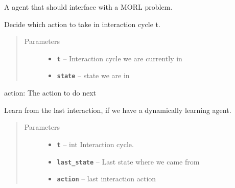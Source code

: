 \documentclass[letterpaper,10pt,english]{sphinxmanual}
\begin{document}

\begin{fulllineitems}
\label{Agents:morl_agents.MorlAgent}
A agent that should interface with a MORL problem.

\begin{fulllineitems}
\label{Agents:morl_agents.MorlAgent.decide}
Decide which action to take in interaction
cycle t.
\begin{quote}\begin{description}
\item[{Parameters}] \leavevmode\begin{itemize}
\item {} 
\textbf{\texttt{t}} -- Interaction cycle we are currently in

\item {} 
\textbf{\texttt{state}} -- state we are in

\end{itemize}

\end{description}\end{quote}

action: The action to do next

\end{fulllineitems}


\begin{fulllineitems}
\label{Agents:morl_agents.MorlAgent.learn}
Learn from the last interaction, if we have
a dynamically learning agent.
\begin{quote}\begin{description}
\item[{Parameters}] \leavevmode\begin{itemize}
\item {} 
\textbf{\texttt{t}} -- int Interaction cycle.

\item {} 
\textbf{\texttt{last\_state}} -- Last state where we came from

\item {} 
\textbf{\texttt{action}} -- last interaction action


\end{itemize}
\end{description}
\end{quote}
\end{fulllineitems}
\end{fulllineitems}
\end{document}
